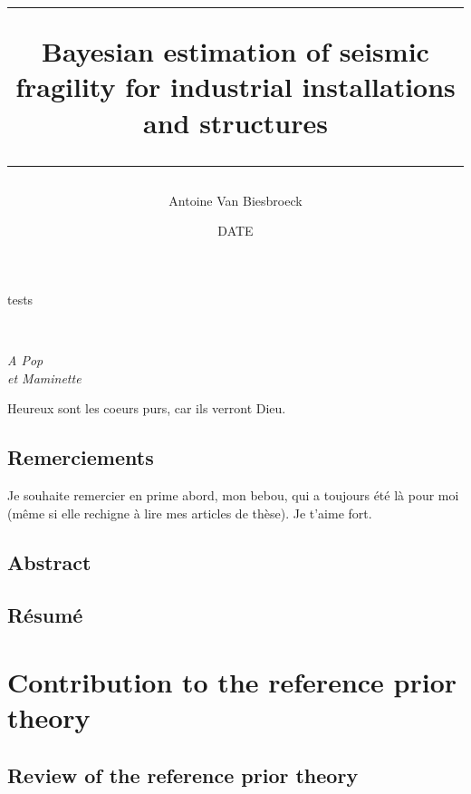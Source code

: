 \documentclass[a4paper]{book}
\title{\hrule\vspace*{0.5em}
    \textbf{Bayesian estimation of seismic fragility for industrial installations and structures}
    \vspace*{0.5em}\\ \hrule
    }
\author{Antoine Van Biesbroeck}
\date{DATE}
\renewcommand{\familydefault}{\sfdefault}
\begin{document}
\pagestyle{empty}

tests

\newpage 
\normalsize
\renewcommand{\familydefault}{\rmdefault}
\normalfont


\maketitle

\ 
\vfill
\begin{FlushRight}\itshape
A Pop\\
et Maminette
\end{FlushRight}
\vfill
Heureux sont les coeurs purs, car ils verront Dieu.

\newpage
\pagestyle{plain}

\chapter*{Remerciements}

Je souhaite remercier en prime abord, mon bebou, qui a toujours été là pour moi (même si elle rechigne à lire mes articles de thèse). Je t'aime fort. 

\newpage

\chapter*{Abstract}

\chapter*{Résumé}


\dominitoc
\tableofcontents
\newpage

\pagestyle{fancy}\thispagestyle{plain}





\part{Contribution to the reference prior theory}\label{part:ref-theory}


\chapter{Review of the reference prior theory}\label{chap:intro-ref}
\end{document}
